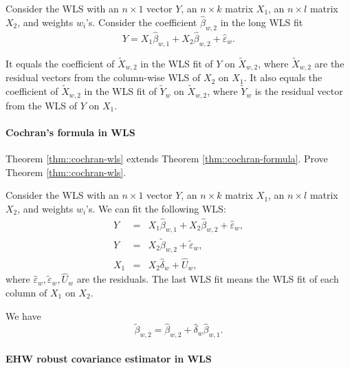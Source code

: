 \begin{theorem}
\label{thm::fwl-wls}
Consider the WLS with an $n\times 1$ vector $Y$, an $n\times k$ matrix $X_1$, an $n\times l$ matrix $X_2$, and weights $w_{i}$'s. 
Consider the coefficient $\hat{\beta}_{w,2} $ in the long WLS fit
\[
Y=X_{1}\hat{\beta}_{w,1}+X_{2}\hat{\beta}_{w,2}+\hat{\varepsilon}_{w} . 
\]

It equals the coefficient of $\tilde{X}_{w,2}$ in the WLS fit of $Y$ on  $\tilde{X}_{w,2}$,
where $\tilde{X}_{w,2}$ are the residual vectors from the column-wise
WLS of $X_{2}$ on $X_{1}$. 
It also equals the coefficient of $\tilde{X}_{w,2}$ in the WLS fit of $\tilde{Y}_{w}$ on  $\tilde{X}_{w,2}$, where $\tilde{Y}_{w}$ is the residual vector from the WLS of $Y$ on $X_{1}$. 
\end{theorem}



\paragraph{Cochran's formula in WLS}\label{hw16::wls-sample-cochran-formula}

Theorem \ref{thm::cochran-wls} extends Theorem \ref{thm::cochran-formula}. Prove Theorem \ref{thm::cochran-wls}. 


\begin{theorem}
\label{thm::cochran-wls}
Consider the WLS with an $n\times 1$ vector $Y$, an $n\times k$ matrix $X_1$, an $n\times l$ matrix $X_2$, and weights $w_{i}$'s. 
We can fit the following WLS:
\begin{eqnarray*}
Y &=& X_1 \hat{\beta}_{w,1} + X_2 \hat{\beta}_{w,2}+ \hat{\varepsilon}_{w},\\
Y &=& X_2 \tilde{\beta}_{w,2} + \tilde{\varepsilon}_w ,\\
X_1 &=& X_2 \hat{\delta}_w + \hat{U}_w,
\end{eqnarray*}
where $\hat{\varepsilon}_w, \tilde{\varepsilon}_w , \hat{U}_w$ are the residuals. 
The last WLS fit means the WLS fit of each column of $X_1$ on $X_2$. 

We have 
$$
\tilde{\beta}_{w,2} = \hat{\beta}_{w,2} +  \hat{\delta}_w \hat{\beta}_{w,1}.
$$
\end{theorem}





\paragraph{EHW robust covariance estimator in WLS}\label{hw16::ehw-wls}


